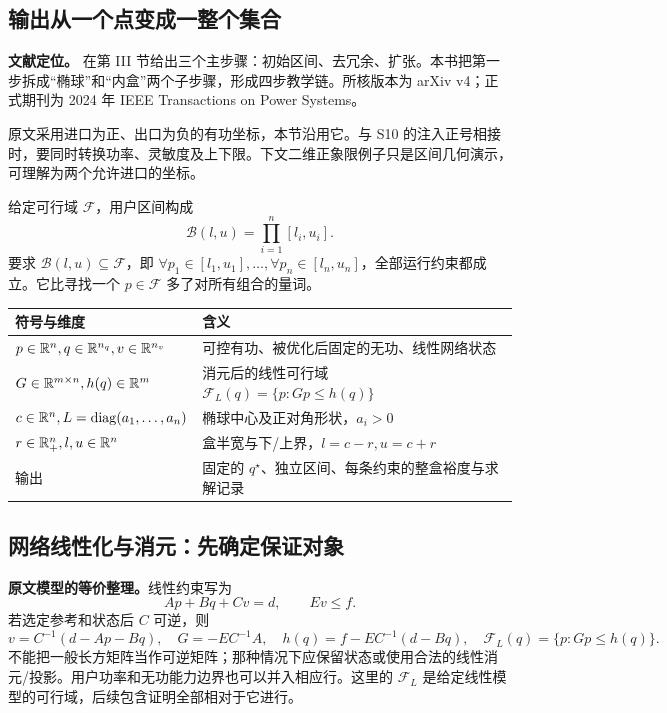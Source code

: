 \subsection{输出从一个点变成一整个集合}

\textbf{文献定位。}\citet{S11} 在第 III 节给出三个主步骤：初始区间、去冗余、扩张。本书把第一步拆成“椭球”和“内盒”两个子步骤，形成四步教学链。所核版本为 arXiv v4；正式期刊为 2024 年 IEEE Transactions on Power Systems。

原文采用进口为正、出口为负的有功坐标，本节沿用它。与 S10 的注入正号相接时，要同时转换功率、灵敏度及上下限。下文二维正象限例子只是区间几何演示，可理解为两个允许进口的坐标。

\begin{definition}[独立运行区间]
给定可行域 $\mathcal F$，用户区间构成
\[
 \mathcal B(l,u)=\prod_{i=1}^n[l_i,u_i].
\]
要求 $\mathcal B(l,u)\subseteq\mathcal F$，即
$\forall p_1\in[l_1,u_1],\ldots,\forall p_n\in[l_n,u_n]$，全部运行约束都成立。它比寻找一个 $p\in\mathcal F$ 多了对所有组合的量词。
\end{definition}

\begin{center}
\begin{tabularx}{\textwidth}{@{}lX@{}}
\toprule
符号与维度 & 含义 \\
\midrule
$p\in\mathbb{R}^n,q\in\mathbb{R}^{n_q},v\in\mathbb{R}^{n_v}$ & 可控有功、被优化后固定的无功、线性网络状态 \\
$G\in\mathbb{R}^{m\times n},h(q)\in\mathbb{R}^m$ & 消元后的线性可行域 $\mathcal F_L(q)=\{p:Gp\le h(q)\}$ \\
$c\in\mathbb{R}^n,L=\operatorname{diag}(a_1,\ldots,a_n)$ & 椭球中心及正对角形状，$a_i>0$ \\
$r\in\mathbb{R}_+^n,l,u\in\mathbb{R}^n$ & 盒半宽与下/上界，$l=c-r,u=c+r$ \\
输出 & 固定的 $q^\star$、独立区间、每条约束的整盒裕度与求解记录 \\
\bottomrule
\end{tabularx}
\end{center}

\subsection{网络线性化与消元：先确定保证对象}

\textbf{原文模型的等价整理。}线性约束写为
\begin{equation}
 Ap+Bq+Cv=d,\qquad Ev\le f.
 \label{eq:oe_s11_linear}
\end{equation}
若选定参考和状态后 $C$ 可逆，则
\begin{equation}
 v=C^{-1}(d-Ap-Bq),\quad
 G=-EC^{-1}A,\quad h(q)=f-EC^{-1}(d-Bq),\quad
 \mathcal F_L(q)=\{p:Gp\le h(q)\}.
 \label{eq:oe_s11_eliminate}
\end{equation}
不能把一般长方矩阵当作可逆矩阵；那种情况下应保留状态或使用合法的线性消元/投影。用户功率和无功能力边界也可以并入相应行。这里的 $\mathcal F_L$ 是给定线性模型的可行域，后续包含证明全部相对于它进行。

